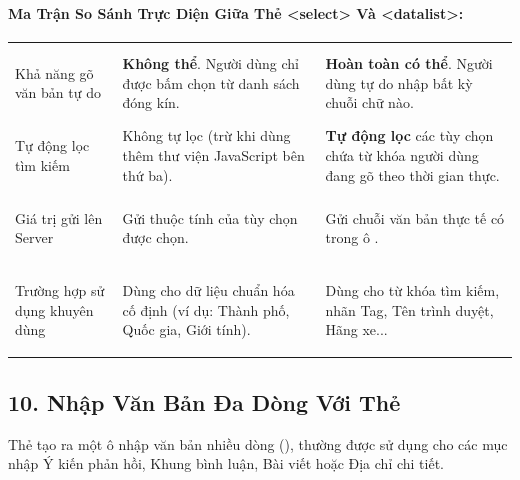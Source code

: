 \paragraph{Ma Trận So Sánh Trực Diện Giữa Thẻ <select> Và <datalist>:}

\begin{prettyTableBox}
\sffamily\small
\begin{tabularx}{\linewidth}{>{\sffamily\bfseries\color{primaryBlue}\raggedright\arraybackslash}m{3.2cm} Z Z}
 &  &  \\

Khả năng gõ văn bản tự do & \textcolor{accentOrange}{\textbf{Không thể}}. Người dùng chỉ được bấm chọn từ danh sách đóng kín. & \textcolor{tipBorder}{\textbf{Hoàn toàn có thể}}. Người dùng tự do nhập bất kỳ chuỗi chữ nào. \\

Tự động lọc tìm kiếm & Không tự lọc (trừ khi dùng thêm thư viện JavaScript bên thứ ba). & \textbf{Tự động lọc} các tùy chọn chứa từ khóa người dùng đang gõ theo thời gian thực. \\

Giá trị gửi lên Server & Gửi thuộc tính  của tùy chọn  được chọn. & Gửi chuỗi văn bản thực tế có trong ô . \\

Trường hợp sử dụng khuyên dùng & Dùng cho dữ liệu chuẩn hóa cố định (ví dụ: Thành phố, Quốc gia, Giới tính). & Dùng cho từ khóa tìm kiếm, nhãn Tag, Tên trình duyệt, Hãng xe... \\
\end{tabularx}
\end{prettyTableBox}

\subsection{10. Nhập Văn Bản Đa Dòng Với Thẻ }

\begin{conceptBox}
Thẻ  tạo ra một ô nhập văn bản nhiều dòng (), thường được sử dụng cho các mục nhập Ý kiến phản hồi, Khung bình luận, Bài viết hoặc Địa chỉ chi tiết.
\end{conceptBox}

